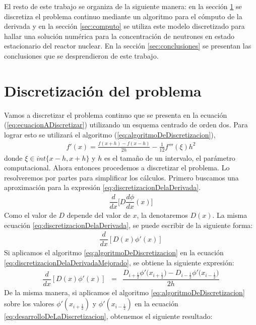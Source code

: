 \documentclass[11pt,a4paper]{emulateapj}
\begin{document}
El resto de este trabajo se organiza de la siguiente manera: en la sección \ref{sec:discretizacion} se discretiza
el problema continuo mediante un algoritmo para el cómputo de la derivada y en la sección \ref{sec:computo} 
se utiliza este modelo discretizado para hallar una solución numérica para la concentración de neutrones
en estado estacionario del reactor nuclear. En la sección \ref{sec:conclusiones} se presentan las conclusiones
que se desprendieron de este trabajo.

\section{Discretización del problema}
\label{sec:discretizacion}
Vamos a discretizar el problema continuo que se presenta en la ecuación (\ref{eq:ecuacionADiscretizar}) 
utilizando un esquema centrado de orden dos. Para lograr esto se utilizará el algoritmo (\ref{eq:algoritmoDeDiscretizacion}),
\begin{eqnarray}
\label{eq:algoritmoDeDiscretizacion}
	f'(x) = \frac{f(x+h) - f(x-h)}{2h} - \frac{1}{12} f'''(\xi) h^2
\end{eqnarray}
donde $\xi \in int\{x-h,x+h\}$ y $h$ es el tamaño de un intervalo, el parámetro computacional.
Ahora entonces procedemos a discretizar el problema. Lo resolveremos por partes para simplificar los cálculos. Primero buscamos una aproximación para la expresión \ref{eq:discretizacionDelaDerivada}.
\begin{eqnarray}
\label{eq:discretizacionDelaDerivada}
	\dfrac{d}{dx}\bigg[D \dfrac{d\phi}{dx}(x)\bigg]  
\end{eqnarray}
Como el valor de $D$ depende del valor de $x$, la denotaremos $D(x)$. La misma ecuación \ref{eq:discretizacionDelaDerivada}, se puede escribir de la siguiente forma:
\begin{eqnarray}
\label{eq:discretizacionDelaDerivadaMejorado}
	\dfrac{d}{dx}[D(x) \phi'(x)]
\end{eqnarray}
Si aplicamos el algoritmo \ref{eq:algoritmoDeDiscretizacion} en la ecuación \ref{eq:discretizacionDelaDerivadaMejorado}, se obtiene la siguiente expresión:
\begin{eqnarray}
\label{eq:desarrolloDeLaDiscretizacion}
	\dfrac{d}{dx}[D(x) \phi'(x)] &=& \dfrac{D_{i+\frac{1}{2}}\phi'\big(x_{i+\frac{1}{2}}\big)  -  D_{i-\frac{1}{2}}\phi'\big(x_{i-\frac{1}{2}}\big)}     {2h} 
\end{eqnarray}
De la misma manera, si aplicamos el algoritmo \ref{eq:algoritmoDeDiscretizacion} sobre los valores $\phi'(x_{i+\frac{1}{2}})$ y $\phi'(x_{i-\frac{1}{2}})$ en la ecuación \ref{eq:desarrolloDeLaDiscretizacion}, obtenemos el siguiente resultado:
\end{document}
